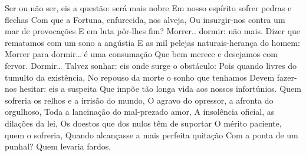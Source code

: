 \label{secintro}
Ser ou não ser, eis a questão: será mais nobre
Em nosso espírito sofrer pedras e flechas
Com que a Fortuna, enfurecida, nos alveja,
Ou insurgir-nos contra um mar de provocações
E em luta pôr-lhes fim? Morrer.. dormir: não mais.
Dizer que rematamos com um sono a angústia
E as mil pelejas naturais-herança do homem:
Morrer para dormir… é uma consumação
Que bem merece e desejamos com fervor.
Dormir… Talvez sonhar: eis onde surge o obstáculo:
Pois quando livres do tumulto da existência,
No repouso da morte o sonho que tenhamos
Devem fazer-nos hesitar: eis a suspeita
Que impõe tão longa vida aos nossos infortúnios.
Quem sofreria os relhos e a irrisão do mundo,
O agravo do opressor, a afronta do orgulhoso,
Toda a lancinação do mal-prezado amor,
A insolência oficial, as dilações da lei,
Os doestos que dos nulos têm de suportar
O mérito paciente, quem o sofreria,
Quando alcançasse a mais perfeita quitação
Com a ponta de um punhal? Quem levaria fardos,





